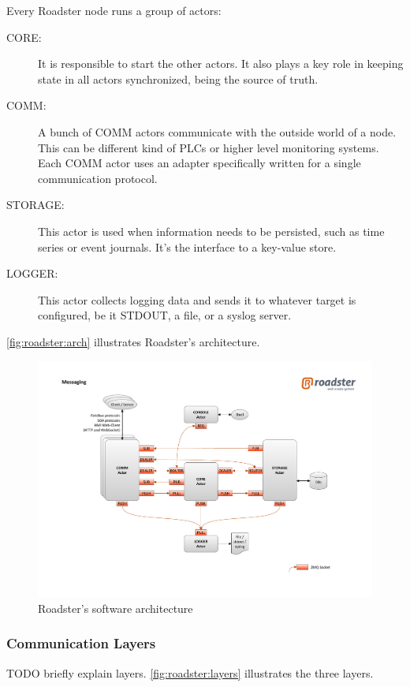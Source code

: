 Every Roadster node runs a group of actors:

\begin{description}
	\item [CORE:]
		It is responsible to start the other actors. It also plays a
		key role in keeping state in all actors synchronized, being the
		source of truth.

	\item [COMM:]
		A bunch of COMM actors communicate with the outside world of a
		node. This can be different kind of PLCs or higher level
		monitoring systems. Each COMM actor uses an adapter
		specifically written for a single communication protocol.

	\item [STORAGE:]
		This actor is used when information needs to be persisted, such
		as time series or event journals. It's the interface to a
		key-value store.

	\item [LOGGER:]
		This actor collects logging data and sends it to whatever
		target is configured, be it STDOUT, a file, or a syslog server.
\end{description}

\autoref{fig:roadster:arch} illustrates Roadster's architecture.

\begin{figure}[!ht]
	\includegraphics[trim=4cm 2cm 3.5cm 2.8cm, clip=true, width=\textwidth]{img/roadster_arch.pdf}
	\caption{Roadster's software architecture}
	\label{fig:roadster:arch}
\end{figure}

\subsubsection{Communication Layers}
TODO briefly explain layers. \autoref{fig:roadster:layers} illustrates the three layers.


